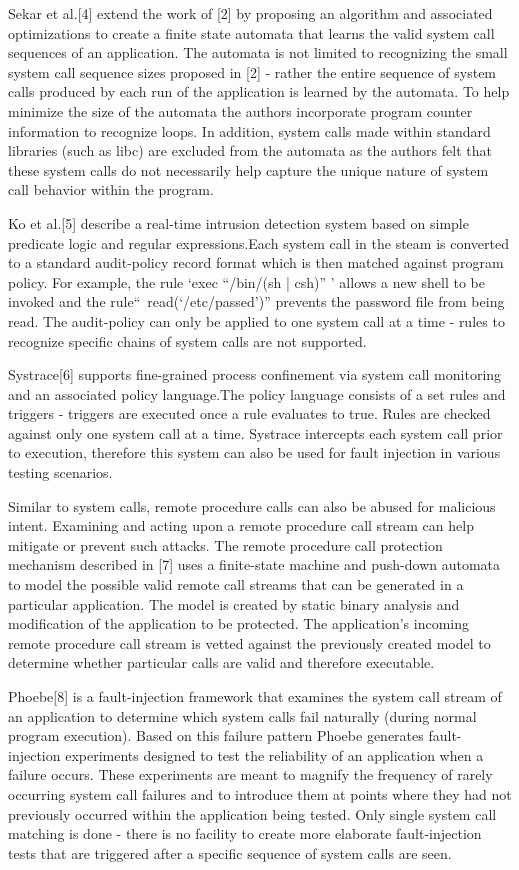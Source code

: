 Sekar et al.[4] extend the work of [2] by proposing an
algorithm and associated optimizations to create a finite state automata that
learns the valid system call sequences of an application. The automata is not
limited to recognizing the small system call sequence sizes proposed in
[2] - rather the entire sequence of system calls produced by each
run of the application is learned by the automata. To help minimize the size of
the automata the authors incorporate program counter information to recognize
loops. In addition, system calls made within standard libraries (such as libc)
are excluded from the automata as the authors felt that these system calls do not
necessarily help capture the unique nature of system call behavior within the
program.

Ko et al.[5] describe a real-time intrusion detection system
based on simple predicate logic and regular expressions.Each system call in the
steam is converted to a standard audit-policy record format which is then
matched against program policy. For example, the rule ‘exec “/bin/(sh | csh)” ’
allows a new shell to be invoked and the rule“~read(‘/etc/passed’)” prevents the
password file from being read. The audit-policy can only be applied to one
system call at a time - rules to recognize specific chains of system calls are
not supported.

Systrace[6] supports fine-grained process confinement
via system call monitoring and an associated policy language.The policy language
consists of a set rules and triggers - triggers are executed once a rule
evaluates to true. Rules are checked against only one system call at a time.
Systrace intercepts each system call prior to execution, therefore this system
can also be used for fault injection in various testing scenarios.

Similar to system calls, remote procedure calls can also be abused for malicious
intent. Examining and acting upon a remote procedure call stream can help
mitigate or prevent such attacks. The remote procedure call protection mechanism
described in [7] uses a finite-state machine and push-down automata
to model the possible valid remote call streams that can be generated in a
particular application. The model is created by static binary analysis
and modification of the application to be protected. The application's incoming
remote procedure call stream is vetted against the previously created model to
determine whether particular calls are valid and therefore
executable.

Phoebe[8] is a fault-injection framework that examines
the system call stream of an application to determine which system calls fail
naturally (during normal program execution). Based on this failure pattern
Phoebe generates fault-injection experiments designed to test the reliability of
an application when a failure occurs. These experiments are meant to magnify the
frequency of rarely occurring system call failures and to introduce them at
points where they had not previously occurred within the application being
tested. Only single system call matching is done - there is no facility to create
more elaborate fault-injection tests that are triggered after a specific
sequence of system calls are seen.

